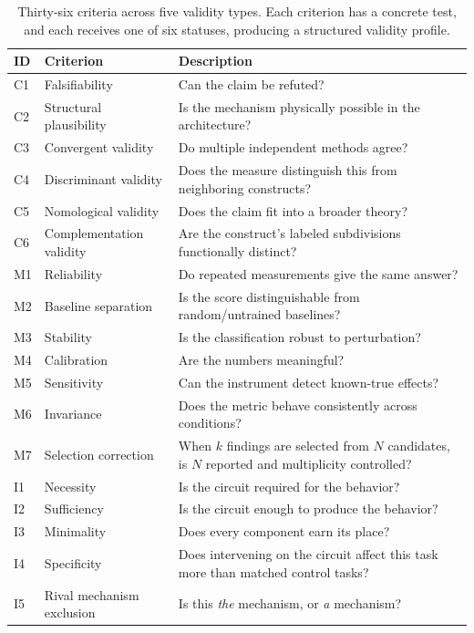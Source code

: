 \documentclass{article}
\newcommand{\tighttable}{\setlength{\tabcolsep}{4pt}\renewcommand{\arraystretch}{1.05}}
\begin{document}
\begingroup
{}
\begin{table}[tbp]
\centering
\footnotesize
\tighttable
\caption{Thirty-six criteria across five validity types. Each criterion has a concrete test, and each receives one of six statuses, producing a structured validity profile.}
\label{tab:criteria}
\begin{tabular}{@{}llp{7.6cm}@{}}
\toprule
\textbf{ID} & \textbf{Criterion} & \textbf{Description} \\
\midrule
C1 & Falsifiability & Can the claim be refuted? \\
C2 & Structural plausibility & Is the mechanism physically possible in the architecture? \\
C3 & Convergent validity & Do multiple independent methods agree? \\
C4 & Discriminant validity & Does the measure distinguish this from neighboring constructs? \\
C5 & Nomological validity & Does the claim fit into a broader theory? \\
C6 & Complementation validity & Are the construct's labeled subdivisions functionally distinct? \\
\midrule
M1 & Reliability & Do repeated measurements give the same answer? \\
M2 & Baseline separation & Is the score distinguishable from random/untrained baselines? \\
M3 & Stability & Is the classification robust to perturbation? \\
M4 & Calibration & Are the numbers meaningful? \\
M5 & Sensitivity & Can the instrument detect known-true effects? \\
M6 & Invariance & Does the metric behave consistently across conditions? \\
M7 & Selection correction & When $k$ findings are selected from $N$ candidates, is $N$ reported and multiplicity controlled? \\
\midrule
I1 & Necessity & Is the circuit required for the behavior? \\
I2 & Sufficiency & Is the circuit enough to produce the behavior? \\
I3 & Minimality & Does every component earn its place? \\
I4 & Specificity & Does intervening on the circuit affect this task more than matched control tasks? \\
I5 & Rival mechanism exclusion & Is this \emph{the} mechanism, or \emph{a} mechanism? \\

\end{tabular}
\end{table}
\end{document}
